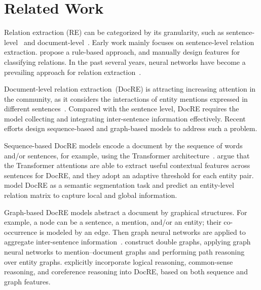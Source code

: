 \documentclass[11pt]{article}
\begin{document}
\section{Related Work}
\label{sec2}
Relation extraction (RE) can be categorized by its granularity, such as sentence-level~\cite{doddington-etal-2004-automatic,xu-etal-2016-improved,wei2019novel} and document-level~\cite{DBLP:journals/corr/abs-1810-05102,zhu-etal-2019-graph}.
Early work mainly focuses on sentence-level relation extraction.  propose a rule-based approach, and  manually design features for classifying relations. In the past several years, neural networks have become a prevailing approach for relation extraction~\cite{xu-etal-2015-classifying,Song_2019}.

Document-level relation extraction~(DocRE) is attracting increasing attention in the community, as it considers the interactions of entity mentions expressed in different sentences~\cite{Li2016cdr,yao-etal-2019-docred}. Compared with the sentence level, DocRE requires the model collecting and integrating inter-sentence information effectively. Recent efforts design sequence-based and graph-based models to address such a problem.

Sequence-based DocRE models encode a document by the sequence of words and/or sentences, for example, using the Transformer architecture~\cite{devlin-etal-2019-bert}.
 argue that the Transformer attentions are able to extract useful contextual features across sentences for DocRE, and they adopt an adaptive threshold for each entity pair.
 model DocRE as a semantic segmentation task and predict an entity-level relation matrix to capture local and global information.

Graph-based DocRE models abstract a document by graphical structures. For example, a node can be a sentence, a mention, and/or an entity; their co-occurrence is modeled by an edge. Then graph neural networks are applied to aggregate inter-sentence information~\cite{quirk-poon-2017-distant,Christopoulou2019ConnectingTD,zeng-etal-2020-double}. 
 construct double graphs, applying graph neural networks to mention--document graphs and performing path reasoning over entity graphs.
 explicitly incorporate logical reasoning, common-sense reasoning, and coreference reasoning into DocRE, based on both sequence and graph features.
\end{document}
